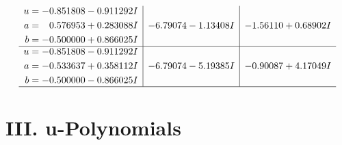 \documentclass[1p]{elsarticle_modified}
\theoremstyle{definition}
\begin{document}
$$\begin{array}{c|c|c}
\begin{aligned}
u &= -0.851808 - 0.911292 I \\
a &= \phantom{-}0.576953 + 0.283088 I \\
b &= -0.500000 + 0.866025 I\end{aligned}
 & -6.79074 - 1.13408 I & -1.56110 + 0.68902 I \\ \hline\begin{aligned}
u &= -0.851808 - 0.911292 I \\
a &= -0.533637 + 0.358112 I \\
b &= -0.500000 - 0.866025 I\end{aligned}
 & -6.79074 - 5.19385 I & -0.90087 + 4.17049 I\\
 \hline 
 \end{array}$$\newpage
\newpage\renewcommand{\arraystretch}{1}
\centering \section*{ III. u-Polynomials}
\end{document}
